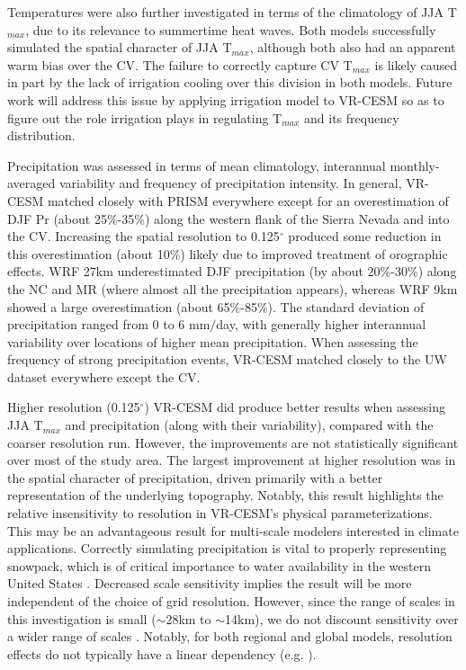 \documentclass[ms]{agutex}   %
\begin{document}
\begin{article}
Temperatures were also further investigated in terms of the climatology of JJA T$_{max}$, due to its relevance to summertime heat waves.  Both models successfully simulated the spatial character of JJA T$_{max}$, although both also had an apparent warm bias over the CV.  The failure to correctly capture CV T$_{max}$ is likely caused in part by the lack of irrigation cooling over this division in both models. Future work will address this issue by applying irrigation model to VR-CESM so as to figure out the role irrigation plays in regulating T$_{max}$ and its frequency distribution.


Precipitation was assessed in terms of mean climatology, interannual monthly-averaged variability and frequency of precipitation intensity.  In general, VR-CESM matched closely with PRISM everywhere except for an  overestimation of DJF Pr (about 25$\%$-35$\%$) along the western flank of the Sierra Nevada and into the CV. Increasing the spatial resolution to 0.125$^\circ$ produced some reduction in this overestimation (about 10$\%$) likely due to improved treatment of orographic effects. WRF 27km underestimated DJF precipitation (by about 20$\%$-30$\%$) along the NC and MR (where almost all the precipitation appears), whereas WRF 9km showed a large overestimation (about 65$\%$-85$\%$). The standard deviation of precipitation ranged from 0 to 6 mm$/$day, with generally higher interannual variability over locations of higher mean precipitation. When assessing the frequency of strong precipitation events, VR-CESM matched closely to the UW dataset everywhere except the CV.

Higher resolution (0.125$^\circ$) VR-CESM did produce better results when assessing JJA T$_{max}$ and precipitation (along with their variability), compared with the coarser resolution run. However, the improvements are not statistically significant over most of the study area.  The largest improvement at higher resolution was in the spatial character of precipitation, driven primarily with a better representation of the underlying topography. Notably, this result highlights the relative insensitivity to resolution in VR-CESM's physical parameterizations. This may be an advantageous result for multi-scale modelers interested in climate applications. Correctly simulating precipitation is vital to properly representing snowpack, which is of critical importance to water availability in the western United States \citep{bales2006mountain, wise2012hydroclimatology, rhoades2015characterizing}. Decreased scale sensitivity implies the result will be more independent of the choice of grid resolution. However, since the range of scales in this investigation is small ($\sim$28km to $\sim$14km), we do not discount sensitivity over a wider range of scales \citep{wehner2010effect, rauscher2010resolution}. Notably, for both regional and global models, resolution effects do not typically have a linear dependency (e.g. \cite{hughes2014landfall, wehner2014effect}).


\end{article}
\end{document}
